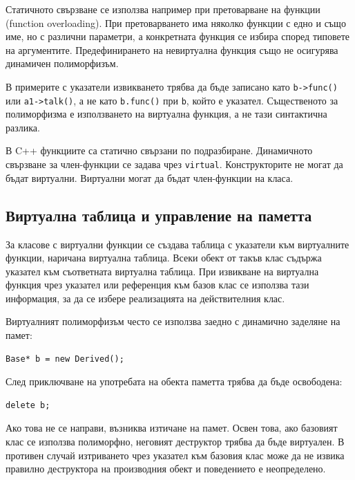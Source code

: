 Статичното свързване се използва например при претоварване на функции (function overloading). При претоварването има няколко функции с едно и също име, но с различни параметри, а конкретната функция се избира според типовете на аргументите. Предефинирането на невиртуална функция също не осигурява динамичен полиморфизъм.

\begin{supp}
В примерите с указатели извикването трябва да бъде записано като \texttt{b->func()} или \texttt{a1->talk()}, а не като \texttt{b.func()} при \texttt{b}, който е указател. Същественото за полиморфизма е използването на виртуална функция, а не тази синтактична разлика.
\end{supp}

В C++ функциите са статично свързани по подразбиране. Динамичното свързване за член-функции се задава чрез \texttt{virtual}. Конструкторите не могат да бъдат виртуални. Виртуални могат да бъдат член-функции на класа.

\subsection{Виртуална таблица и управление на паметта}\label{s:17.2.3}

За класове с виртуални функции се създава таблица с указатели към виртуалните функции, наричана виртуална таблица. Всеки обект от такъв клас съдържа указател към съответната виртуална таблица. При извикване на виртуална функция чрез указател или референция към базов клас се използва тази информация, за да се избере реализацията на действителния клас.

Виртуалният полиморфизъм често се използва заедно с динамично заделяне на памет:

\begin{verbatim}
Base* b = new Derived();
\end{verbatim}

След приключване на употребата на обекта паметта трябва да бъде освободена:

\begin{verbatim}
delete b;
\end{verbatim}

Ако това не се направи, възниква изтичане на памет. Освен това, ако базовият клас се използва полиморфно, неговият деструктор трябва да бъде виртуален. В противен случай изтриването чрез указател към базовия клас може да не извика правилно деструктора на производния обект и поведението е неопределено.


